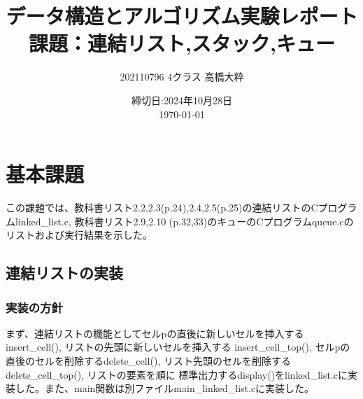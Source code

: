 \documentclass{ltjsarticle}
\begin{document}
\title{データ構造とアルゴリズム実験レポート\\
課題：連結リスト,スタック,キュー}
\author{202110796 4クラス 高橋大粋}
\date{締切日:2024年10月28日\\
\today}
\maketitle

\section{基本課題}
この課題では、教科書リスト2.2,2.3(p.24),2.4,2.5(p.25)の連結リストのCプログラムlinked\_list.c, 教科書リスト2.9,2.10
(p.32,33)のキューのCプログラムqueue.cのリストおよび実行結果を示した。
\subsection{連結リストの実装}
\subsubsection{実装の方針}\label{subsubsec:実装の方針1}
まず、連結リストの機能としてセルpの直後に新しいセルを挿入するinsert\_cell(), リストの先頭に新しいセルを挿入する
insert\_cell\_top(), セルpの直後のセルを削除するdelete\_cell(), リスト先頭のセルを削除するdelete\_cell\_top(), リストの要素を順に
標準出力するdisplay()をlinked_list.cに実装した。また、main関数は別ファイルmain\_linked\_list.cに実装した。
\end{document}
